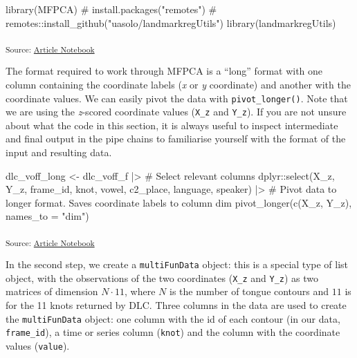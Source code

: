 \documentclass[
  man,
  longtable,
  nolmodern,
  notxfonts,
  notimes,
  colorlinks=true,linkcolor=blue,citecolor=blue,urlcolor=blue]{apa7}
\newenvironment{Shaded}{\begin{snugshade}}{\end{snugshade}}
\newcommand{\AttributeTok}[1]{\textcolor[rgb]{0.40,0.45,0.13}{#1}}
\newcommand{\CommentTok}[1]{\textcolor[rgb]{0.37,0.37,0.37}{#1}}
\newcommand{\FunctionTok}[1]{\textcolor[rgb]{0.28,0.35,0.67}{#1}}
\newcommand{\NormalTok}[1]{\textcolor[rgb]{0.00,0.23,0.31}{#1}}
\newcommand{\OtherTok}[1]{\textcolor[rgb]{0.00,0.23,0.31}{#1}}
\newcommand{\SpecialCharTok}[1]{\textcolor[rgb]{0.37,0.37,0.37}{#1}}
\newcommand{\StringTok}[1]{\textcolor[rgb]{0.13,0.47,0.30}{#1}}
\begin{document}
\begin{Shaded}
\begin{Highlighting}[]
\FunctionTok{library}\NormalTok{(MFPCA)}
\CommentTok{\# install.packages("remotes")}
\CommentTok{\# remotes::install\_github("uasolo/landmarkregUtils")}
\FunctionTok{library}\NormalTok{(landmarkregUtils)}
\end{Highlighting}
\end{Shaded}

\textsubscript{Source:
\href{https://stefanocoretta.github.io/mv_uti/index.qmd.html}{Article
Notebook}}

The format required to work through MFPCA is a ``long'' format with one
column containing the coordinate labels (\emph{x} or \emph{y}
coordinate) and another with the coordinate values. We can easily pivot
the data with \texttt{pivot\_longer()}. Note that we are using the
\emph{z}-scored coordinate values (\texttt{X\_z} and \texttt{Y\_z}). If
you are not unsure about what the code in this section, it is always
useful to inspect intermediate and final output in the pipe chains to
familiarise yourself with the format of the input and resulting data.

\begin{Shaded}
\begin{Highlighting}[]
\NormalTok{dlc\_voff\_long }\OtherTok{\textless{}{-}}\NormalTok{ dlc\_voff\_f }\SpecialCharTok{|\textgreater{}} 
  \CommentTok{\# Select relevant columns}
\NormalTok{  dplyr}\SpecialCharTok{::}\FunctionTok{select}\NormalTok{(X\_z, Y\_z, frame\_id, knot, vowel, c2\_place, language, speaker) }\SpecialCharTok{|\textgreater{}} 
  \CommentTok{\# Pivot data to longer format. Saves coordinate labels to column \textasciigrave{}dim\textasciigrave{}}
  \FunctionTok{pivot\_longer}\NormalTok{(}\FunctionTok{c}\NormalTok{(X\_z, Y\_z), }\AttributeTok{names\_to =} \StringTok{"dim"}\NormalTok{)}
\end{Highlighting}
\end{Shaded}

\textsubscript{Source:
\href{https://stefanocoretta.github.io/mv_uti/index.qmd.html}{Article
Notebook}}

In the second step, we create a \texttt{multiFunData} object: this is a
special type of list object, with the observations of the two
coordinates (\texttt{X\_z} and \texttt{Y\_z}) as two matrices of
dimension \(N \cdot 11\), where \(N\) is the number of tongue contours
and \(11\) is for the 11 knots returned by DLC. Three columns in the
data are used to create the \texttt{multiFunData} object: one column
with the id of each contour (in our data, \texttt{frame\_id}), a time or
series column (\texttt{knot}) and the column with the coordinate values
(\texttt{value}).
\end{document}
